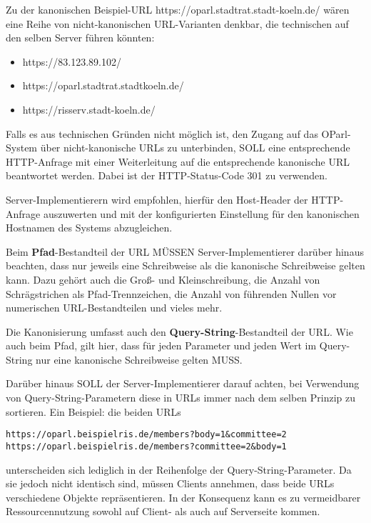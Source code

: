 \documentclass[,a4paper]{article}
\begin{document}
Zu der kanonischen Beispiel-URL https://oparl.stadtrat.stadt-koeln.de/
wären eine Reihe von nicht-kanonischen URL-Varianten denkbar, die
technischen auf den selben Server führen könnten:

\begin{itemize}
\itemsep1pt\parskip0pt
\item
  https://83.123.89.102/
\item
  https://oparl.stadtrat.stadtkoeln.de/
\item
  https://risserv.stadt-koeln.de/
\end{itemize}

Falls es aus technischen Gründen nicht möglich ist, den Zugang auf das
OParl-System über nicht-kanonische URLs zu unterbinden, SOLL eine
entsprechende HTTP-Anfrage mit einer Weiterleitung auf die entsprechende
kanonische URL beantwortet werden. Dabei ist der HTTP-Status-Code 301 zu
verwenden.

Server-Implementierern wird empfohlen, hierfür den Host-Header der
HTTP-Anfrage auszuwerten und mit der konfigurierten Einstellung für den
kanonischen Hostnamen des Systems abzugleichen.

Beim \textbf{Pfad}-Bestandteil der URL MÜSSEN Server-Implementierer
darüber hinaus beachten, dass nur jeweils eine Schreibweise als die
kanonische Schreibweise gelten kann. Dazu gehört auch die Groß- und
Kleinschreibung, die Anzahl von Schrägstrichen als Pfad-Trennzeichen,
die Anzahl von führenden Nullen vor numerischen URL-Bestandteilen und
vieles mehr.

Die Kanonisierung umfasst auch den \textbf{Query-String}-Bestandteil der
URL. Wie auch beim Pfad, gilt hier, dass für jeden Parameter und jeden
Wert im Query-String nur eine kanonische Schreibweise gelten MUSS.

Darüber hinaus SOLL der Server-Implementierer darauf achten, bei
Verwendung von Query-String-Parametern diese in URLs immer nach dem
selben Prinzip zu sortieren. Ein Beispiel: die beiden URLs

\begin{verbatim}
https://oparl.beispielris.de/members?body=1&committee=2
https://oparl.beispielris.de/members?committee=2&body=1
\end{verbatim}

unterscheiden sich lediglich in der Reihenfolge der
Query-String-Parameter. Da sie jedoch nicht identisch sind, müssen
Clients annehmen, dass beide URLs verschiedene Objekte repräsentieren.
In der Konsequenz kann es zu vermeidbarer Ressourcennutzung sowohl auf
Client- als auch auf Serverseite kommen.
\end{document}
